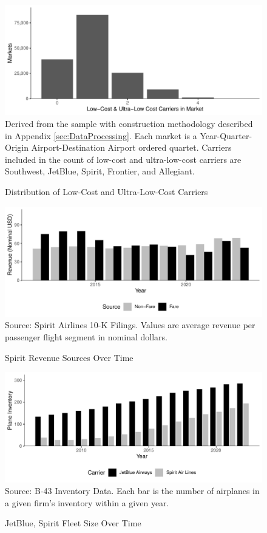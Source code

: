 \documentclass{article}
\begin{document}
\begin{figure}[h]
        \caption{Distribution of Low-Cost and Ultra-Low-Cost Carriers}
        \label{fig:LCC_Distribution}
        \includegraphics[width = \linewidth]{05.Figures/LCC_Market_Graph.pdf}
        \footnotesize{Derived from the sample with construction methodology described in Appendix \ref{sec:DataProcessing}. Each market is a Year-Quarter-Origin Airport-Destination Airport ordered quartet. Carriers included in the count of low-cost and ultra-low-cost carriers are Southwest, JetBlue, Spirit, Frontier, and Allegiant.}
    \end{figure}

\begin{figure}[h]
\caption{Spirit Revenue Sources Over Time}
\label{fig:Spirit_Revenue_Sources}
    \includegraphics[width = \linewidth]{05.Figures/Spirit_Revenue_Sources.pdf}
\footnotesize{Source: Spirit Airlines 10-K Filings. Values are average revenue per passenger flight segment in nominal dollars. }
\end{figure}

    	\begin{figure}[h]
	\caption{JetBlue, Spirit Fleet Size Over Time}
	\label{fig:Both_fleet}
	\includegraphics[width = \linewidth]{Both_Planes.pdf}
	\footnotesize{Source: B-43 Inventory Data. Each bar is the number of airplanes in a given firm's inventory within a given year.}
\end{figure}
\end{document}

